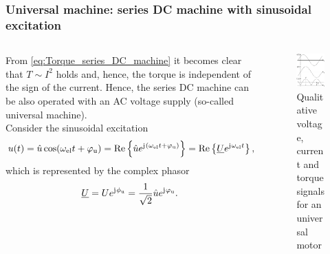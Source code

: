 \begin{frame}
	\frametitle{Universal machine: series DC machine with sinusoidal excitation}
	\begin{columns}
		\begin{column}{0.55\textwidth}
		From \eqref{eq:Torque_series_DC_machine} it becomes clear that $T\sim I^2$ holds and, hence, the torque is independent of the sign of the current. Hence, the series DC machine can be also operated with an AC voltage supply (so-called universal machine).
		\\[1em]
		Consider the sinusoidal excitation $$u(t) = \hat{u} \cos(\omega_\mathrm{el} t+ \varphi_{\mathrm{u}}) = \mathrm{Re}\left\{\hat{u} e^{\mathrm{j}\mkern1mu (\omega_\mathrm{el} t + \varphi_{\mathrm{u}})}\right\} = \mathrm{Re}\left\{\underline{U} e^{\mathrm{j}\mkern1mu \omega_\mathrm{el} t}\right\},$$ which is represented by the complex phasor 
		\begin{equation}
			\underline{U} = U e ^{\mathrm{j}\mkern1mu \phi_{\mathrm{u}}} = \frac{1}{\sqrt{2}}\hat{u} e ^{\mathrm{j}\mkern1mu \varphi_{\mathrm{u}}}. 
		\end{equation}
\end{column}
\hfill
\begin{column}{0.45\textwidth}
	\begin{figure}
		\centering
		\includegraphics[scale=1.05]{fig/lec03/Universal_machine_time_signals.pdf}
		\caption{Qualitative voltage, current and torque signals for an universal motor}
	\end{figure}
\end{column}
\end{columns}
\end{frame}

